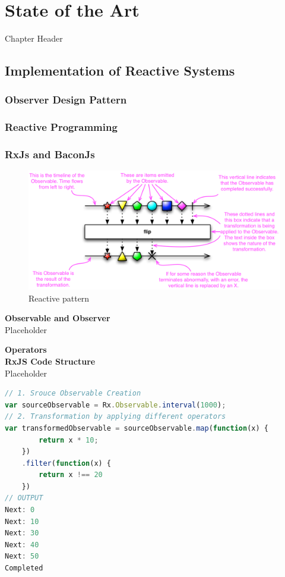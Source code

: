 \chapter{State of the Art} \label{chap:State of the Art}
Chapter Header

\section{Implementation of Reactive Systems}

\subsection{Observer Design Pattern}

\subsection{Reactive Programming}

\subsection{RxJs and BaconJs}

\begin{figure}[!h]
	\centering
	\includegraphics[scale=0.5,trim=0 0 0 0]{gfx/rxjs-reactive-pattern2.png}
	\caption{Reactive pattern \protect\cite{ReactiveXobservable}}
	\label{fig:rxjs-reactive-pattern}
\end{figure}

\textbf{Observable and Observer}\\
Placeholder

\textbf{Operators}
\label{subsec:Operators}\\

\textbf{RxJS Code Structure}\\
Placeholder
\begin{lstlisting}[language=JavaScript, caption=RxJS Simple Example, label={lst:RxJS_Simple_Example}]
// 1. Srouce Observable Creation
var sourceObservable = Rx.Observable.interval(1000);
// 2. Transformation by applying different operators
var transformedObservable = sourceObservable.map(function(x) {
		return x * 10;
	})
	.filter(function(x) {
		return x !== 20
	})
// OUTPUT
Next: 0
Next: 10
Next: 30
Next: 40
Next: 50
Completed
\end{lstlisting}

